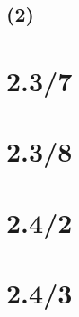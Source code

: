 \documentclass[11pt,a4paper]{article}
\begin{document}
\subsection*{(2)}




\section{2.3/7}
\section{2.3/8}
\section{2.4/2}
\section{2.4/3}
\end{document}
